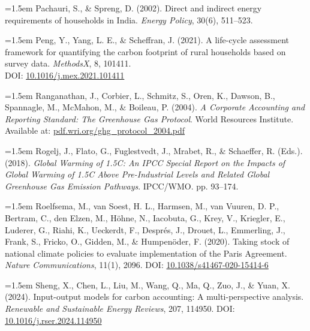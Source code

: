 \documentclass[12pt,a4paper]{article}%
\begin{document}
\vspace{0.5em}
{\small
\noindent
\parbox{\linewidth}{
\hangindent=1.5em
Pachauri, S., \& Spreng, D. (2002). Direct and indirect energy requirements of households in India. \textit{Energy Policy}, 30(6), 511–523.
}
}

\vspace{0.5em}
{\small
\noindent
\parbox{\linewidth}{
\hangindent=1.5em
Peng, Y., Yang, L. E., \& Scheffran, J. (2021). A life-cycle assessment framework for quantifying the carbon footprint of rural households based on survey data. \textit{MethodsX}, 8, 101411. \\
DOI: \href{https://doi.org/10.1016/j.mex.2021.101411}{10.1016/j.mex.2021.101411}
}
}

\vspace{0.5em}
{\small
\noindent
\parbox{\linewidth}{
\hangindent=1.5em
Ranganathan, J., Corbier, L., Schmitz, S., Oren, K., Dawson, B., Spannagle, M., McMahon, M., \& Boileau, P. (2004). \textit{A Corporate Accounting and Reporting Standard: The Greenhouse Gas Protocol}. World Resources Institute. \\
Available at: \href{http://pdf.wri.org/ghg_protocol_2004.pdf}{pdf.wri.org/ghg\_protocol\_2004.pdf}
}
}

\vspace{0.5em}
{\small
\noindent
\begin{minipage}{\linewidth}
\hangindent=1.5em
Rogelj, J., Flato, G., Fuglestvedt, J., Mrabet, R., \& Schaeffer, R. (Eds.). (2018). \textit{Global Warming of 1.5\degree C: An IPCC Special Report on the Impacts of Global Warming of 1.5\degree C Above Pre-Industrial Levels and Related Global Greenhouse Gas Emission Pathways}. IPCC/WMO. pp. 93–174.
\end{minipage}
}

\vspace{0.5em}
{\small
\noindent
\parbox{\linewidth}{
\hangindent=1.5em
Roelfsema, M., van Soest, H. L., Harmsen, M., van Vuuren, D. P., Bertram, C., den Elzen, M., Höhne, N., Iacobuta, G., Krey, V., Kriegler, E., Luderer, G., Riahi, K., Ueckerdt, F., Després, J., Drouet, L., Emmerling, J., Frank, S., Fricko, O., Gidden, M., \& Humpenöder, F. (2020). Taking stock of national climate policies to evaluate implementation of the Paris Agreement. \textit{Nature Communications}, 11(1), 2096. 
DOI: \href{https://doi.org/10.1038/s41467-020-15414-6}{10.1038/s41467-020-15414-6}
}
}

\vspace{0.5em}
{\small
\noindent
\parbox{\linewidth}{
\hangindent=1.5em
Sheng, X., Chen, L., Liu, M., Wang, Q., Ma, Q., Zuo, J., \& Yuan, X. (2024). Input-output models for carbon accounting: A multi-perspective analysis. \textit{Renewable and Sustainable Energy Reviews}, 207, 114950. 
DOI: \href{https://doi.org/10.1016/j.rser.2024.114950}{10.1016/j.rser.2024.114950}
}
}
\end{document}
